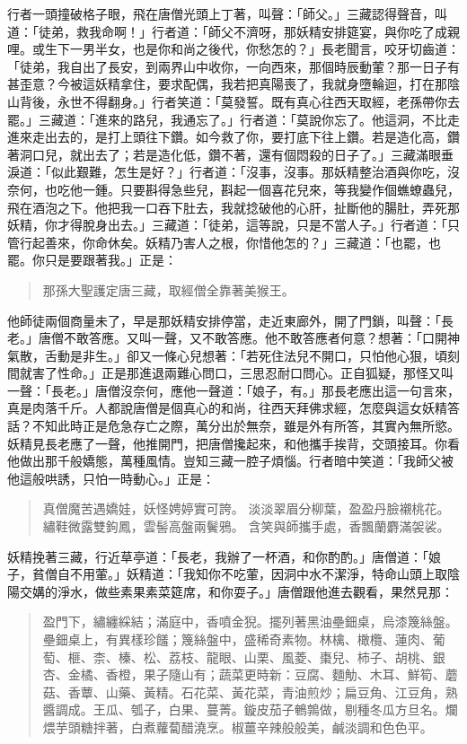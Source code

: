 行者一頭撞破格子眼，飛在唐僧光頭上丁著，叫聲：「師父。」三藏認得聲音，叫道：「徒弟，救我命啊！」行者道：「師父不濟呀，那妖精安排筵宴，與你吃了成親哩。或生下一男半女，也是你和尚之後代，你愁怎的？」長老聞言，咬牙切齒道：「徒弟，我自出了長安，到兩界山中收你，一向西來，那個時辰動葷？那一日子有甚歪意？今被這妖精拿住，要求配偶，我若把真陽喪了，我就身墮輪迴，打在那陰山背後，永世不得翻身。」行者笑道：「莫發誓。既有真心往西天取經，老孫帶你去罷。」三藏道：「進來的路兒，我通忘了。」行者道：「莫說你忘了。他這洞，不比走進來走出去的，是打上頭往下鑽。如今救了你，要打底下往上鑽。若是造化高，鑽著洞口兒，就出去了；若是造化低，鑽不著，還有個悶殺的日子了。」三藏滿眼垂淚道：「似此艱難，怎生是好？」行者道：「沒事，沒事。那妖精整治酒與你吃，沒奈何，也吃他一鍾。只要斟得急些兒，斟起一個喜花兒來，等我變作個蟭蟟蟲兒，飛在酒泡之下。他把我一口吞下肚去，我就捻破他的心肝，扯斷他的腸肚，弄死那妖精，你才得脫身出去。」三藏道：「徒弟，這等說，只是不當人子。」行者道：「只管行起善來，你命休矣。妖精乃害人之根，你惜他怎的？」三藏道：「也罷，也罷。你只是要跟著我。」正是：
\begin{quote}
那孫大聖護定唐三藏，取經僧全靠著美猴王。
\end{quote}

他師徒兩個商量未了，早是那妖精安排停當，走近東廊外，開了門鎖，叫聲：「長老。」唐僧不敢答應。又叫一聲，又不敢答應。他不敢答應者何意？想著：「口開神氣散，舌動是非生。」卻又一條心兒想著：「若死住法兒不開口，只怕他心狠，頃刻間就害了性命。」正是那進退兩難心問口，三思忍耐口問心。正自狐疑，那怪又叫一聲：「長老。」唐僧沒奈何，應他一聲道：「娘子，有。」那長老應出這一句言來，真是肉落千斤。人都說唐僧是個真心的和尚，往西天拜佛求經，怎麼與這女妖精答話？不知此時正是危急存亡之際，萬分出於無奈，雖是外有所答，其實內無所慾。妖精見長老應了一聲，他推開門，把唐僧攙起來，和他攜手挨背，交頭接耳。你看他做出那千般嬌態，萬種風情。豈知三藏一腔子煩惱。行者暗中笑道：「我師父被他這般哄誘，只怕一時動心。」正是：
\begin{quote}
真僧魔苦遇嬌娃，妖怪娉婷實可誇。
淡淡翠眉分柳葉，盈盈丹臉襯桃花。
繡鞋微露雙鉤鳳，雲髻高盤兩鬢鴉。
含笑與師攜手處，香飄蘭麝滿袈裟。
\end{quote}

妖精挽著三藏，行近草亭道：「長老，我辦了一杯酒，和你酌酌。」唐僧道：「娘子，貧僧自不用葷。」妖精道：「我知你不吃葷，因洞中水不潔淨，特命山頭上取陰陽交媾的淨水，做些素果素菜筵席，和你耍子。」唐僧跟他進去觀看，果然見那：
\begin{quote}
盈門下，繡纏綵結；滿庭中，香噴金猊。擺列著黑油壘鈿桌，烏漆篾絲盤。壘鈿桌上，有異樣珍饈；篾絲盤中，盛稀奇素物。林檎、橄欖、蓮肉、葡萄、榧、柰、榛、松、荔枝、龍眼、山栗、風菱、棗兒、柿子、胡桃、銀杏、金橘、香橙，果子隨山有；蔬菜更時新：豆腐、麵觔、木耳、鮮筍、蘑菇、香蕈、山藥、黃精。石花菜、黃花菜，青油煎炒；扁豆角、江豆角，熟醬調成。王瓜、瓠子，白果、蔓菁。鏇皮茄子鵪鶉做，剔種冬瓜方旦名。爛煨芋頭糖拌著，白煮蘿蔔醋澆烹。椒薑辛辣般般美，鹹淡調和色色平。
\end{quote}

